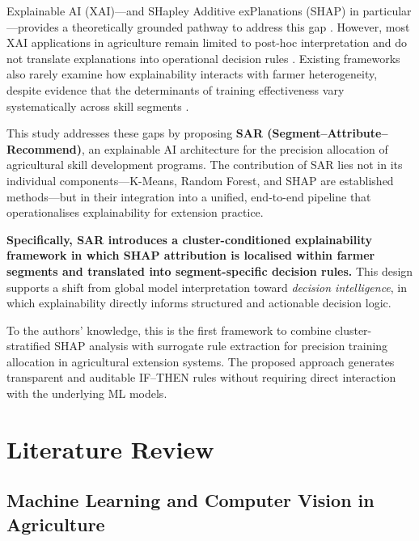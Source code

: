 \documentclass[3p,twocolumn,authoryear]{elsarticle}
\begin{document}
Explainable AI (XAI)—and SHapley Additive exPlanations (SHAP) in
particular—provides a theoretically grounded pathway to address this gap
\citep{lundberg2017,guidotti2019}.
However, most XAI applications in agriculture remain limited to post-hoc
interpretation and do not translate explanations into operational
decision rules
\citep{ryo2022,linardatos2021}.
Existing frameworks also rarely examine how explainability interacts with
farmer heterogeneity, despite evidence that the determinants of training
effectiveness vary systematically across skill segments
\citep{davis2012,arrieta2020}.

This study addresses these gaps by proposing \textbf{SAR
(Segment--Attribute--Recommend)}, an explainable AI architecture for the
precision allocation of agricultural skill development programs.
The contribution of SAR lies not in its individual components—K-Means,
Random Forest, and SHAP are established methods—but in their integration
into a unified, end-to-end pipeline that operationalises explainability
for extension practice.

\textbf{Specifically, SAR introduces a cluster-conditioned explainability
framework in which SHAP attribution is localised within farmer segments
and translated into segment-specific decision rules.}
This design supports a shift from global model interpretation toward
\textit{decision intelligence}, in which explainability directly informs
structured and actionable decision logic.

To the authors’ knowledge, this is the first framework to combine
cluster-stratified SHAP analysis with surrogate rule extraction for
precision training allocation in agricultural extension systems.
The proposed approach generates transparent and auditable IF--THEN rules
without requiring direct interaction with the underlying ML models.

\section{Literature Review}

\subsection{Machine Learning and Computer Vision in Agriculture}
\end{document}
